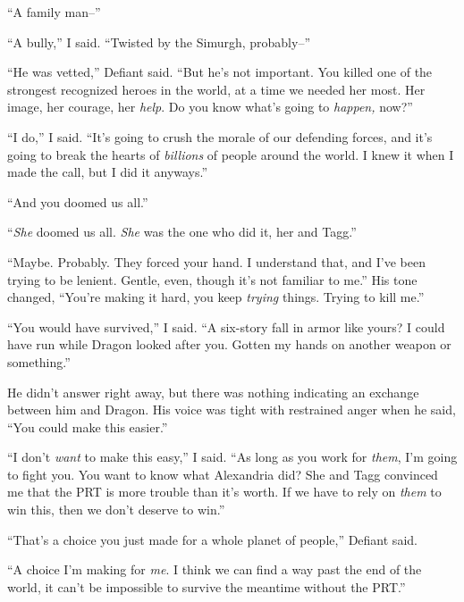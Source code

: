 ``A family man--''



``A bully,'' I said.  ``Twisted by the Simurgh, probably--''



``He was vetted,'' Defiant said.  ``But he's not important.  You killed one of the strongest recognized heroes in the world, at a time we needed her most.  Her image, her courage, her \emph{help}.  Do you know what's going to \emph{happen, }now?''



``I do,'' I said.  ``It's going to crush the morale of our defending forces, and it's going to break the hearts of \emph{billions} of people around the world.  I knew it when I made the call, but I did it anyways.''



``And you doomed us all.''



``\emph{She} doomed us all.  \emph{She }was the one who did it, her and Tagg.''



``Maybe.  Probably.  They forced your hand.  I understand that, and I've been trying to be lenient.  Gentle, even, though it's not familiar to me.''  His tone changed, ``You're making it hard, you keep \emph{trying} things.  Trying to kill me.''



``You would have survived,'' I said.  ``A six-story fall in armor like yours?  I could have run while Dragon looked after you.  Gotten my hands on another weapon or something.''



He didn't answer right away, but there was nothing indicating an exchange between him and Dragon.  His voice was tight with restrained anger when he said, ``You could make this easier.''



``I don't \emph{want }to make this easy,'' I said.  ``As long as you work for \emph{them}, I'm going to fight you.  You want to know what Alexandria did?  She and Tagg convinced me that the PRT is more trouble than it's worth.  If we have to rely on \emph{them} to win this, then we don't deserve to win.''



``That's a choice you just made for a whole planet of people,'' Defiant said.



``A choice I'm making for \emph{me}.  I think we can find a way past the end of the world, it can't be impossible to survive the meantime without the PRT.''



